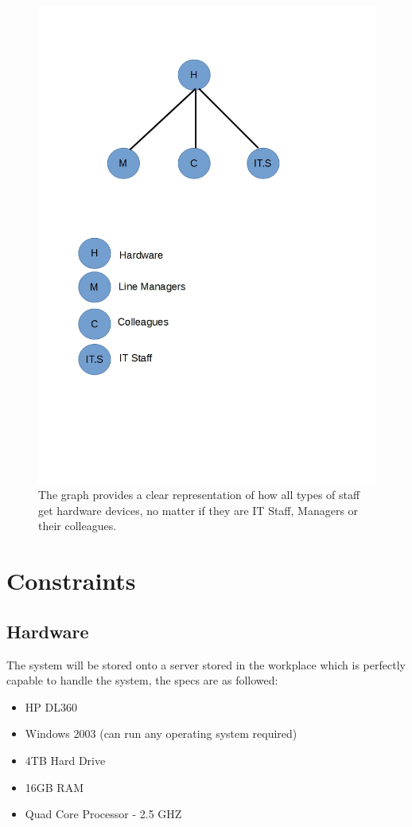 \begin{figure}[H]
\includegraphics[width=.9\textwidth,height=.9\textheight,keepaspectratio]{HardwareGraph.jpg}
\caption{The graph provides a clear representation of how all types of staff get hardware devices, no matter if they are IT Staff, Managers or their colleagues.} \label{Page1Interview}
\end{figure}

\section{Constraints}

\subsection{Hardware}

The system will be stored onto a server stored in the workplace which is perfectly capable to handle the system, the specs are as followed:

\begin{itemize}
\item HP DL360
\item Windows 2003 (can run any operating system required)
\item 4TB Hard Drive
\item 16GB RAM
\item Quad Core Processor - 2.5 GHZ
\end{itemize}

